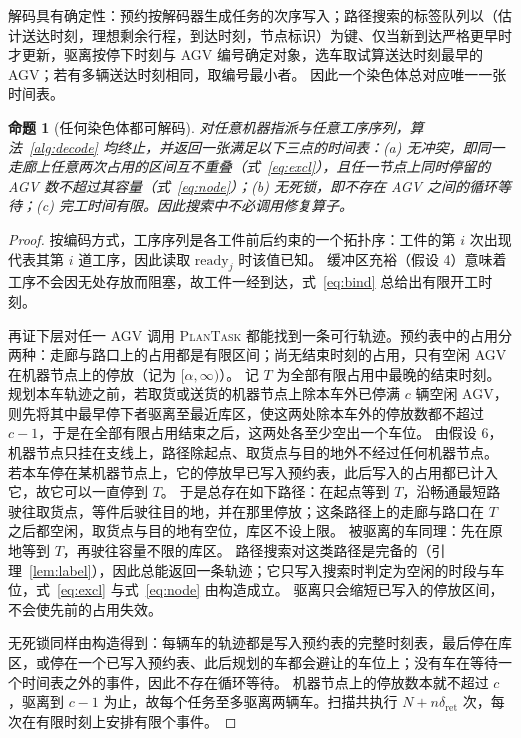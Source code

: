 \documentclass[manuscript,screen,review]{acmart}
\newtheorem{prop}{命题}
\begin{document}
解码具有确定性：预约按解码器生成任务的次序写入；路径搜索的标签队列以（估计送达时刻，理想剩余行程，到达时刻，节点标识）为键、仅当新到达严格更早时才更新，驱离按停下时刻与 AGV 编号确定对象，选车取试算送达时刻最早的 AGV；若有多辆送达时刻相同，取编号最小者。
因此一个染色体总对应唯一一张时间表。

\begin{prop}[任何染色体都可解码]
  \label{prop:decodable}
  对任意机器指派与任意工序序列，算法~\ref{alg:decode} 均终止，并返回一张满足以下三点的时间表：(a) 无冲突，即同一走廊上任意两次占用的区间互不重叠（式~\eqref{eq:excl}），且任一节点上同时停留的 AGV 数不超过其容量（式~\eqref{eq:node}）；(b) 无死锁，即不存在 AGV 之间的循环等待；(c) 完工时间有限。因此搜索中不必调用修复算子。
\end{prop}

\begin{proof}
  按编码方式，工序序列是各工件前后约束的一个拓扑序：工件的第 $i$ 次出现代表其第 $i$ 道工序，因此读取 $\mathrm{ready}_j$ 时该值已知。
  缓冲区充裕（假设 4）意味着工序不会因无处存放而阻塞，故工件一经到达，式~\eqref{eq:bind} 总给出有限开工时刻。

  再证下层对任一 AGV 调用 \textsc{PlanTask} 都能找到一条可行轨迹。预约表中的占用分两种：走廊与路口上的占用都是有限区间；尚无结束时刻的占用，只有空闲 AGV 在机器节点上的停放（记为 $[\alpha,\infty)$）。
  记 $T$ 为全部有限占用中最晚的结束时刻。规划本车轨迹之前，若取货或送货的机器节点上除本车外已停满 $c$ 辆空闲 AGV，则先将其中最早停下者驱离至最近库区，使这两处除本车外的停放数都不超过 $c-1$，于是在全部有限占用结束之后，这两处各至少空出一个车位。
  由假设 6，机器节点只挂在支线上，路径除起点、取货点与目的地外不经过任何机器节点。
  若本车停在某机器节点上，它的停放早已写入预约表，此后写入的占用都已计入它，故它可以一直停到 $T$。
  于是总存在如下路径：在起点等到 $T$，沿畅通最短路驶往取货点，等件后驶往目的地，并在那里停放；这条路径上的走廊与路口在 $T$ 之后都空闲，取货点与目的地有空位，库区不设上限。
  被驱离的车同理：先在原地等到 $T$，再驶往容量不限的库区。
  路径搜索对这类路径是完备的（引理~\ref{lem:label}），因此总能返回一条轨迹；它只写入搜索时判定为空闲的时段与车位，式~\eqref{eq:excl} 与式~\eqref{eq:node} 由构造成立。
  驱离只会缩短已写入的停放区间，不会使先前的占用失效。

  无死锁同样由构造得到：每辆车的轨迹都是写入预约表的完整时刻表，最后停在库区，或停在一个已写入预约表、此后规划的车都会避让的车位上；没有车在等待一个时间表之外的事件，因此不存在循环等待。
  机器节点上的停放数本就不超过 $c$，驱离到 $c-1$ 为止，故每个任务至多驱离两辆车。扫描共执行 $N+n\delta_{\mathrm{ret}}$ 次，每次在有限时刻上安排有限个事件。
\end{proof}
\end{document}
